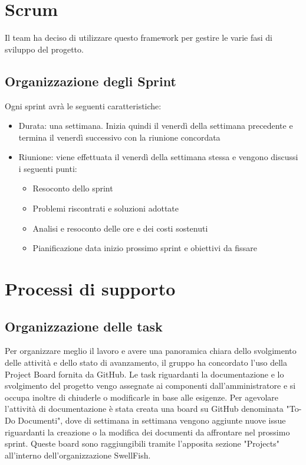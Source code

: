 \documentclass[12pt]{article}
\begin{document}
\section{Scrum}
Il team ha deciso di utilizzare questo framework per gestire le varie fasi di sviluppo del progetto.
\subsection{Organizzazione degli Sprint}
Ogni sprint avrà le seguenti caratteristiche:
\begin{itemize}
    \item Durata: una settimana. Inizia quindi il venerdì della settimana precedente e termina il venerdì successivo con la riunione concordata
    \item Riunione: viene effettuata il venerdì della settimana stessa e vengono discussi i seguenti punti:
    \begin{itemize}
        \item Resoconto dello sprint
        \item Problemi riscontrati e soluzioni adottate
        \item Analisi e resoconto delle ore e dei costi sostenuti
        \item Pianificazione data inizio prossimo sprint e obiettivi da fissare
    \end{itemize}
    
\end{itemize}

\section{Processi di supporto}
\subsection{Organizzazione delle task}
Per organizzare meglio il lavoro e avere una panoramica chiara dello svolgimento delle attività e dello stato di avanzamento, il gruppo ha concordato l'uso della Project Board fornita da GitHub.
Le task riguardanti la documentazione e lo svolgimento del progetto vengo assegnate ai componenti dall'amministratore e si occupa inoltre di chiuderle o modificarle in base alle esigenze.
Per agevolare l'attività di documentazione è stata creata una board su GitHub denominata "To-Do Documenti", dove di settimana in settimana vengono aggiunte nuove issue riguardanti la creazione o la modifica dei documenti da affrontare nel prossimo sprint.
Queste board sono raggiungibili tramite l'apposita sezione "Projects" all'interno dell'organizzazione SwellFish.
\end{document}

